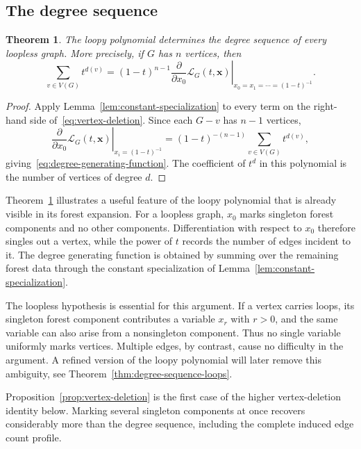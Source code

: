 \documentclass[11pt]{article}
\theoremstyle{plain}
\newtheorem{theorem}{Theorem}[section]
\theoremstyle{definition}
\renewcommand{\mathcal}{\mathscr}
\newcommand{\LL}{\mathcal{L}}    %
\newcommand{\bx}{\mathbf{x}}
\numberwithin{equation}{section}
\begin{document}
\subsection{The degree sequence}\label{subsec:degree-sequence-thm}


\begin{theorem}\label{thm:L-degree-sequence}
The loopy polynomial determines the degree sequence of every loopless graph.  More precisely, if $G$ has $n$ vertices, then
\begin{equation}\label{eq:degree-generating-function}
   \sum_{v\in V(G)}t^{d(v)}
   =
   (1-t)^{n-1}
   \left.
      \frac{\partial}{\partial x_0}\LL_G(t,\bx)
   \right|_{x_0=x_1=\cdots=(1-t)^{-1}}.
\end{equation}
\end{theorem}

\begin{proof}
Apply Lemma~\ref{lem:constant-specialization} to every term on the right-hand
side of~\eqref{eq:vertex-deletion}.  Since each $G-v$ has $n-1$ vertices,
\[
   \left.
      \frac{\partial}{\partial x_0}\LL_G(t,\bx)
   \right|_{x_i=(1-t)^{-1}}
   =
   (1-t)^{-(n-1)}
   \sum_{v\in V(G)}t^{d(v)},
\]
giving~\eqref{eq:degree-generating-function}.  The coefficient of $t^d$ in this polynomial
is the number of vertices of degree $d$.
\end{proof}


Theorem~\ref{thm:L-degree-sequence} illustrates a useful feature of the loopy polynomial that is already visible in its forest expansion.
For a loopless graph, $x_0$ marks singleton forest components and no other components.
Differentiation with respect to $x_0$ therefore singles out a vertex, while the power of $t$ records the number of edges incident to it.
The degree generating function is obtained by summing over the remaining forest data through the constant specialization of Lemma~\ref{lem:constant-specialization}.

The loopless hypothesis is essential for this argument.
If a vertex carries loops, its singleton forest component contributes a variable $x_r$
with $r>0$, and the same variable can also arise from a nonsingleton component.
Thus no single variable uniformly marks vertices.
Multiple edges, by contrast, cause no difficulty in the argument.
A refined version of the loopy polynomial will later remove this ambiguity,
see Theorem~\ref{thm:degree-sequence-loops}.


Proposition~\ref{prop:vertex-deletion} is the first case of the higher vertex-deletion identity below.
Marking several singleton components at once recovers considerably more than the degree sequence,
including the complete induced edge count profile.
\end{document}
